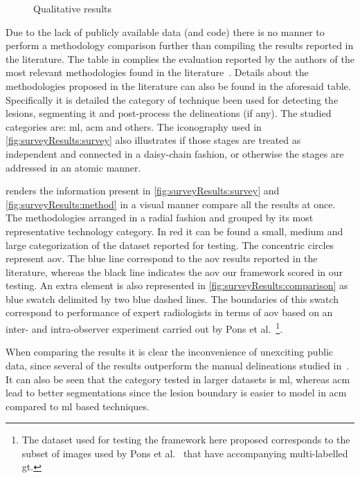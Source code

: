 \begin{figure}[h]
  \caption{Qualitative results}
  \label{fig:results}
\end{figure}

Due to the lack of publicly available data (and code) there is no manner to perform a methodology comparison further than compiling the results reported in the literature.
The table in  complies the evaluation reported by the authors of the most relevant methodologies found in the literature~\cite{massich2013phd}.
Details about the methodologies proposed in the literature can also be found in the aforesaid table.
Specifically it is detailed the category of technique been used for detecting the lesions, segmenting it and post-process the delineations (if any).
The studied categories are: \ac{ml}, \ac{acm} and others.
The iconography used in \cref{fig:surveyResults:survey} also illustrates if those stages are treated as independent and connected in a daisy-chain fashion, or otherwise the stages are addressed in an atomic manner.

 renders the information present in \cref{fig:surveyResults:survey} and \cref{fig:surveyResults:method} in a visual manner compare all the results at once.
The methodologies arranged in a radial fashion and grouped by its most representative technology category. 
In red it can be found a small, medium and large categorization of the dataset reported for testing.
The concentric circles represent \ac{aov}. 
The blue line correspond to the \ac{aov} results reported in the literature, whereas the black line indicates the \ac{aov} our framework scored in our testing.
An extra element is also represented in \cref{fig:surveyResults:comparison} as blue swatch delimited by two blue dashed lines.
The boundaries of this swatch correspond to performance of expert radiologists in terms of \ac{aov} based on an inter- and intra-observer experiment carried out by Pons et al.~\cite{gerard2013}\footnote{The dataset used for testing the framework here proposed corresponds to the subset of images used by Pons et al.~\cite{gerard2013} that have accompanying multi-labelled \ac{gt}.}.

When comparing the results it is clear the inconvenience of unexciting public data, since several of the results outperform the manual delineations studied in~\cite{gerard2013}.
It can also be seen that the category tested in larger datasets is \ac{ml}, whereas \ac{acm} lead to better segmentations since the lesion boundary is easier to model in \ac{acm} compared to \ac{ml} based techniques.


